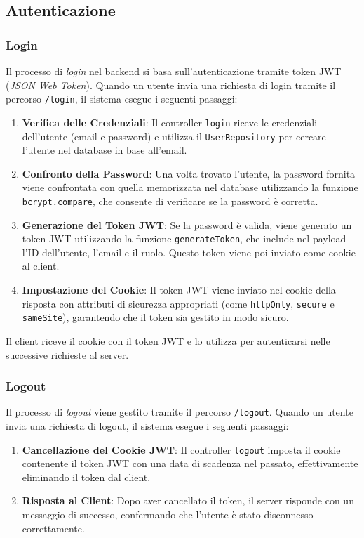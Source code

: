 \documentclass[twoside]{supsistudent}
\begin{document}
\subsection{Autenticazione}
\subsubsection{Login}

Il processo di \textit{login} nel backend si basa sull'autenticazione tramite token JWT (\textit{JSON Web Token}). Quando un utente invia una richiesta di login tramite il percorso \texttt{/login}, il sistema esegue i seguenti passaggi:

\begin{enumerate}
  \item \textbf{Verifica delle Credenziali}: Il controller \texttt{login} riceve le credenziali dell'utente (email e password) e utilizza il \texttt{UserRepository} per cercare l'utente nel database in base all'email.
  \item \textbf{Confronto della Password}: Una volta trovato l'utente, la password fornita viene confrontata con quella memorizzata nel database utilizzando la funzione \texttt{bcrypt.compare}, che consente di verificare se la password è corretta.
  \item \textbf{Generazione del Token JWT}: Se la password è valida, viene generato un token JWT utilizzando la funzione \texttt{generateToken}, che include nel payload l'ID dell'utente, l'email e il ruolo. Questo token viene poi inviato come cookie al client.
  \item \textbf{Impostazione del Cookie}: Il token JWT viene inviato nel cookie della risposta con attributi di sicurezza appropriati (come \texttt{httpOnly}, \texttt{secure} e \texttt{sameSite}), garantendo che il token sia gestito in modo sicuro.
\end{enumerate}

Il client riceve il cookie con il token JWT e lo utilizza per autenticarsi nelle successive richieste al server.

\subsubsection{Logout}

Il processo di \textit{logout} viene gestito tramite il percorso \texttt{/logout}. Quando un utente invia una richiesta di logout, il sistema esegue i seguenti passaggi:

\begin{enumerate}
  \item \textbf{Cancellazione del Cookie JWT}: Il controller \texttt{logout} imposta il cookie contenente il token JWT con una data di scadenza nel passato, effettivamente eliminando il token dal client.
  \item \textbf{Risposta al Client}: Dopo aver cancellato il token, il server risponde con un messaggio di successo, confermando che l'utente è stato disconnesso correttamente.
\end{enumerate}
\end{document}

